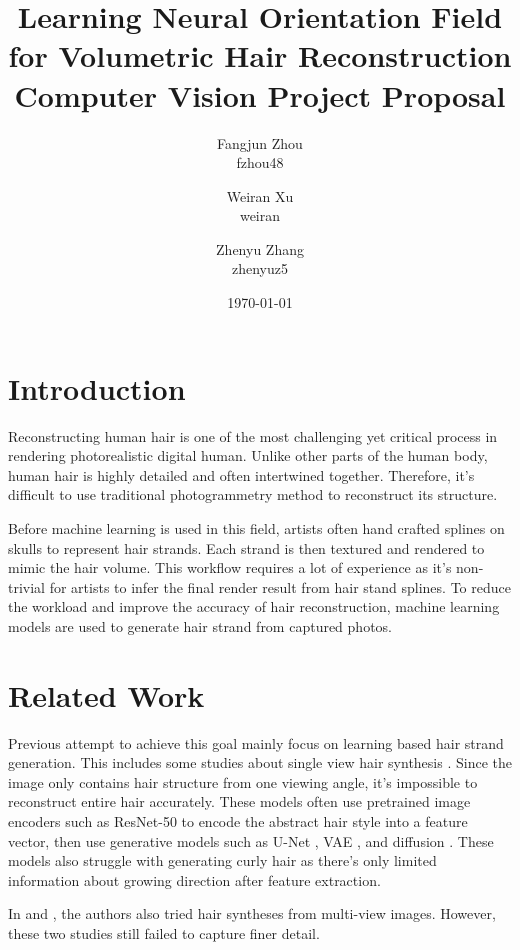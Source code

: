 \documentclass[12pt]{article}
\title{
  Learning Neural Orientation Field for Volumetric Hair Reconstruction \\
  {
    \small
    Computer Vision Project Proposal
  }
}
\author{
  Fangjun Zhou \\ fzhou48
  \and Weiran Xu \\ weiran
  \and Zhenyu Zhang \\ zhenyuz5
}
\date{\today}
\begin{document}
  \maketitle

  \section{Introduction}

  Reconstructing human hair is one of the most challenging yet critical process in rendering photorealistic digital human. Unlike other parts of the human body, human hair is highly detailed and often intertwined together. Therefore, it's difficult to use traditional photogrammetry method to reconstruct its structure.

  Before machine learning is used in this field, artists often hand crafted splines on skulls to represent hair strands. Each strand is then textured and rendered to mimic the hair volume. This workflow requires a lot of experience as it's non-trivial for artists to infer the final render result from hair stand splines. To reduce the workload and improve the accuracy of hair reconstruction, machine learning models are used to generate hair strand from captured photos.

  \section{Related Work}

  Previous attempt to achieve this goal mainly focus on learning based hair strand generation. This includes some studies about single view hair synthesis \cite{saito_3d_2018, zheng_hairstep_2023, wu_neuralhdhair_2022, ma_single-view_nodate}. Since the image only contains hair structure from one viewing angle, it's impossible to reconstruct entire hair accurately. These models often use pretrained image encoders such as ResNet-50 \cite{saito_3d_2018} to encode the abstract hair style into a feature vector, then use generative models such as U-Net \cite{zheng_hairstep_2023}, VAE \cite{saito_3d_2018}, and diffusion \cite{sklyarova_neural_2023}. These models also struggle with generating curly hair as there's only limited information about growing direction after feature extraction.

  In \cite{sklyarova_neural_2023} and \cite{rosu_neural_2022}, the authors also tried hair syntheses from multi-view images. However, these two studies still failed to capture finer detail.
\end{document}
